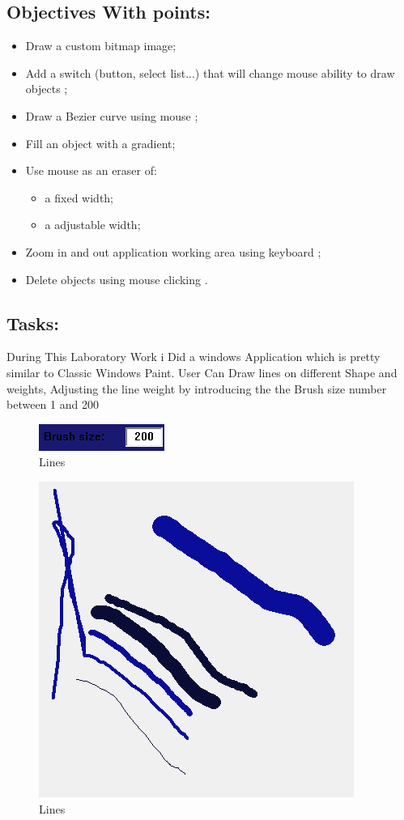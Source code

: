 \documentclass[12pt]{article}
\begin{document}
        \subsection*{Objectives With points:}
        \begin{itemize}
                \item Draw a custom bitmap image;
                \item Add a switch (button, select list...) that will change mouse ability to draw objects ;
                \item Draw a Bezier curve using mouse ;
                \item Fill an object with a gradient;
                \item Use mouse as an eraser of:
                \begin{itemize}
                        \item a fixed width; 
                        \item a adjustable width;
                \end{itemize}
                \item Zoom in and out application working area using keyboard  ;
                \item Delete objects using mouse clicking .
        \end{itemize}


        \subsection*{Tasks:}
        During This Laboratory Work i Did a windows Application which is pretty similar to Classic Windows Paint. User Can Draw lines on different Shape and weights, Adjusting the line weight by introducing the the Brush size number between 1 and 200
        \begin{figure}[H]
                \centering
                \includegraphics[width=.5\textwidth]{img1.png}
                \caption{Lines}
        \end{figure}
        \begin{figure}[H]
                \centering
                \includegraphics[width=.5\textwidth]{img2.png}
                \caption{Lines}
        \end{figure}
        \vspace{0.5 cm}
\end{document}
